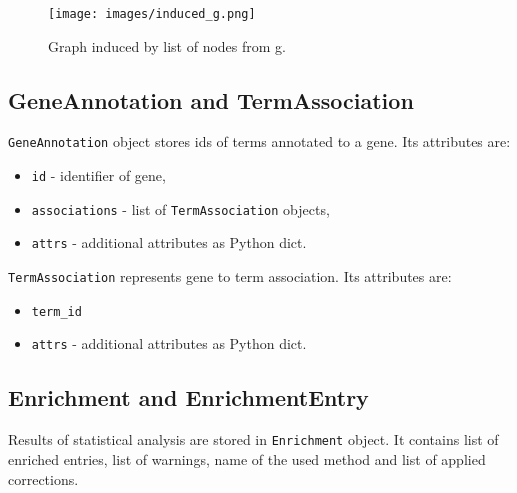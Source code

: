 \begin{htmlonly}
\label{fig:ontoinducedgraph}
\end{htmlonly}

\begin{latexonly}
\begin{figure}[htbp]
\centering
\texttt{[image: images/induced\_g.png]}
\caption{Graph induced by list of nodes from g.}
\label{fig:ontoinducedgraph}
\end{figure}
\end{latexonly}


\subsection{GeneAnnotation and TermAssociation}

\verb|GeneAnnotation| object stores ids of terms annotated to a gene.
Its attributes are:
\begin{itemize}
\item \verb|id| - identifier of gene,
\item \verb|associations| - list of \verb|TermAssociation| objects,
\item \verb|attrs| - additional attributes as Python dict.
\end{itemize}

\verb|TermAssociation| represents gene to term association.
Its attributes are:
\begin{itemize}
\item \verb|term_id|
\item \verb|attrs| - additional attributes as Python dict.
\end{itemize}

\subsection{Enrichment and EnrichmentEntry}
Results of statistical analysis are stored in \verb|Enrichment| object. It
contains list of enriched entries, list of warnings, name of the used method
and list of applied corrections.

